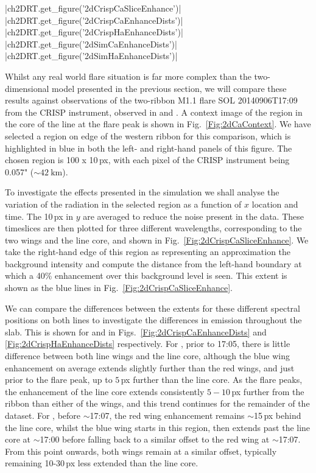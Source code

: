 \py[2DRT]|ch2DRT.get_figure('2dCrispCaSliceEnhance')|
\py[2DRT]|ch2DRT.get_figure('2dCrispCaEnhanceDists')|
\py[2DRT]|ch2DRT.get_figure('2dCrispHaEnhanceDists')|
\py[2DRT]|ch2DRT.get_figure('2dSimCaEnhanceDists')|
\py[2DRT]|ch2DRT.get_figure('2dSimHaEnhanceDists')|

Whilst any real world flare situation is far more complex than the two-dimensional model presented in the previous section, we will compare these results against observations of the two-ribbon M1.1 flare SOL 20140906T17:09 from the CRISP instrument, observed in \Ha{} and \CaLine{}.
A context image of the region in the core of the \CaLine{} line at the flare peak is shown in Fig.~\ref{Fig:2dCaContext}.
We have selected a region on edge of the western ribbon for this comparison, which is highlighted in blue in both the left- and right-hand panels of this figure.
The chosen region is 100 x 10\,{}px, with each pixel of the CRISP instrument being 0.057" ($\sim\SI{42}{\kilo\metre}$).

To investigate the effects presented in the simulation we shall analyse the variation of the radiation in the selected region as a function of $x$ location and time.
The 10\,{}px in $y$ are averaged to reduce the noise present in the data.
These timeslices are then plotted for three different wavelengths, corresponding to the two wings and the line core, and shown in Fig.~\ref{Fig:2dCrispCaSliceEnhance}.
We take the right-hand edge of this region as representing an approximation the background intensity and compute the distance from the left-hand boundary at which a 40\% enhancement over this background level is seen.
This extent is shown as the blue lines in Fig.~\ref{Fig:2dCrispCaSliceEnhance}.

We can compare the differences between the extents for these different spectral positions on both lines to investigate the differences in emission throughout the slab.
This is shown for \CaLine{} and \Ha{} in Figs.~\ref{Fig:2dCrispCaEnhanceDists} and \ref{Fig:2dCrispHaEnhanceDists} respectively.
For \CaLine{}, prior to 17:05, there is little difference between both line wings and the line core, although the blue wing enhancement on average extends slightly further than the red wings, and just prior to the flare peak, up to $5$\,{}px further than the line core.
As the flare peaks, the enhancement of the line core extends consistently $5-10$\,{}px further from the ribbon than either of the wings, and this trend continues for the remainder of the dataset.
For \Ha{}, before $\sim$17:07, the red wing enhancement remains $\sim$15\,{}px behind the line core, whilst the blue wing starts in this region, then extends past the line core at $\sim$17:00 before falling back to a similar offset to the red wing at $\sim$17:07.
From this point onwards, both wings remain at a similar offset, typically remaining 10-30\,{}px less extended than the line core.


